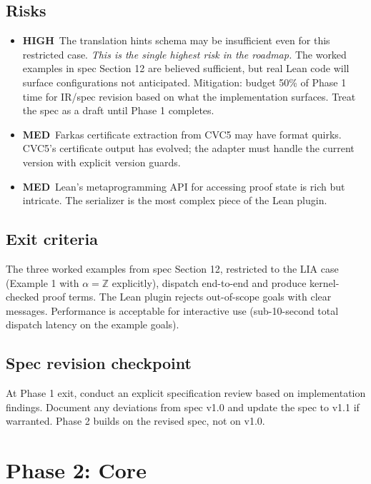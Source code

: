 \documentclass[11pt,letterpaper]{article}
\newcommand{\highrisk}{\textcolor{riskhigh}{\textbf{HIGH}}}
\newcommand{\medrisk}{\textcolor{riskmed}{\textbf{MED}}}
\begin{document}
\subsection{Risks}

\begin{itemize}
  \item \highrisk\ The translation hints schema may be insufficient even
        for this restricted case. \emph{This is the single highest risk
        in the roadmap.} The worked examples in spec Section 12 are
        believed sufficient, but real Lean code will surface
        configurations not anticipated. Mitigation: budget 50\% of Phase
        1 time for IR/spec revision based on what the implementation
        surfaces. Treat the spec as a draft until Phase 1 completes.
  \item \medrisk\ Farkas certificate extraction from CVC5 may have
        format quirks. CVC5's certificate output has evolved; the
        adapter must handle the current version with explicit version
        guards.
  \item \medrisk\ Lean's metaprogramming API for accessing proof state
        is rich but intricate. The serializer is the most complex piece
        of the Lean plugin.
\end{itemize}

\subsection{Exit criteria}

The three worked examples from spec Section 12, restricted to the
LIA case (Example 1 with $\alpha = \mathbb{Z}$ explicitly), dispatch
end-to-end and produce kernel-checked proof terms. The Lean plugin
rejects out-of-scope goals with clear messages. Performance is acceptable
for interactive use (sub-10-second total dispatch latency on the
example goals).

\subsection{Spec revision checkpoint}

At Phase 1 exit, conduct an explicit specification review based on
implementation findings. Document any deviations from spec v1.0 and
update the spec to v1.1 if warranted. Phase 2 builds on the revised
spec, not on v1.0.

\section{Phase 2: Core}
\label{sec:phase2}
\end{document}
